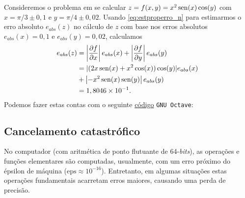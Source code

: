 \begin{ex}\label{ex:properro_2}
  Consideremos o problema em se calcular $z = f(x,y) = x^2\operatorname{sen}(x)\cos(y)$ com $x=\pi/3 \pm 0,1$ e $y=\pi/4 \pm 0,02$. Usando \eqref{eq:estproperro_n} para estimarmos o erro absoluto $e_{abs}(z)$ no cálculo de $z$ com base nos erros absolutos $e_{abs}(x)=0,1$ e $e_{abs}(y)=0,02$, calculamos
  \begin{align}
    e_{abs}(z) &= \left|\frac{\partial f}{\partial x}\right|e_{abs}(x) + \left|\frac{\partial f}{\partial y}\right|e_{abs}(y)\\
             &= |(2x\operatorname{sen}(x) + x^2\cos(x))\cos(y)|e_{abs}(x) \nonumber\\
               &+ \left|-x^2\operatorname{sen}(x)\operatorname{sen}(y)\right|e_{abs}(y)\\
             &= 1,8046\times 10^{-1}.
  \end{align}
\ifisoctave
Podemos fazer estas contas com o seguinte \href{https://github.com/phkonzen/notas/blob/master/src/MatematicaNumerica/cap_aritm/dados/ex_properro_2/ex_properro_2.m}{código} \verb+GNU Octave+:

\fi
\end{ex}


\subsection{Cancelamento catastrófico}

No computador (com aritmética de ponto flutuante de 64-{\it bits}), as operações e funções elementares são computadas, usualmente, com um erro próximo do épsilon de máquina ($\mathrm{eps} \approx 10^{-16}$). Entretanto, em algumas situações estas operações fundamentais acarretam erros maiores, causando uma perda de precisão.


